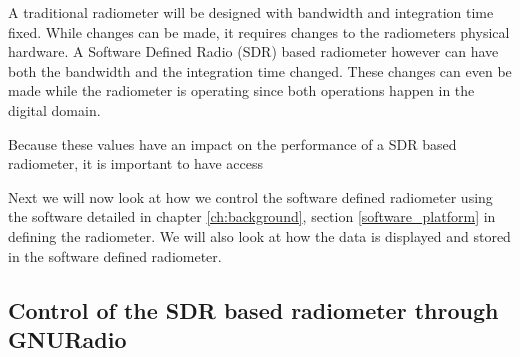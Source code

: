 A traditional radiometer will be designed with bandwidth and integration time fixed.  While changes can be made, it requires changes to the radiometers physical hardware.  A Software Defined Radio (SDR) based radiometer however can have both the  bandwidth and the integration time changed.  These changes can even be made while the radiometer is operating since both operations happen in the digital domain.  

Because these values have an impact on the performance of a SDR based radiometer, it is important to have access 




Next we will now look at how we control the software defined radiometer using the software detailed in chapter \ref{ch:background}, section \ref{software_platform} in defining the radiometer.  We will also look at how the data is displayed and stored in the software defined radiometer.

\subsection{Control of the SDR based radiometer through GNURadio}

